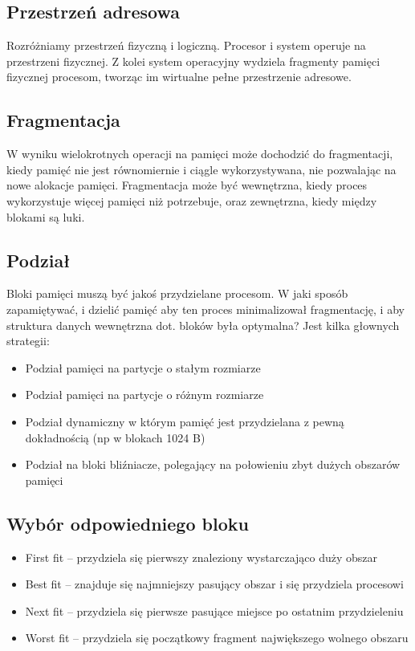 \documentclass{../notatki}
\begin{document}
\subsection{Przestrzeń adresowa}

Rozróżniamy przestrzeń fizyczną i logiczną. Procesor i system operuje
na przestrzeni fizycznej. Z kolei system operacyjny wydziela
fragmenty pamięci fizycznej procesom, tworząc im wirtualne pełne
przestrzenie adresowe.

\subsection{Fragmentacja}

W wyniku wielokrotnych operacji na pamięci może dochodzić do
fragmentacji, kiedy pamięć nie jest równomiernie i ciągle
wykorzystywana, nie pozwalając na nowe alokacje pamięci. Fragmentacja
może być wewnętrzna, kiedy proces wykorzystuje więcej pamięci niż
potrzebuje, oraz zewnętrzna, kiedy między blokami są luki.

\subsection{Podział}

Bloki pamięci muszą być jakoś przydzielane procesom. W jaki sposób
zapamiętywać, i dzielić pamięć aby ten proces minimalizował
fragmentację, i aby struktura danych wewnętrzna dot. bloków była
optymalna? Jest kilka głownych strategii:

\begin{itemize}
  \item Podział pamięci na partycje o stałym rozmiarze
  \item Podział pamięci na partycje o różnym rozmiarze
  \item Podział dynamiczny w którym pamięć jest przydzielana z pewną
    dokładnością (np w blokach 1024 B)
  \item Podział na bloki bliźniacze, polegający na połowieniu zbyt
    dużych obszarów pamięci
\end{itemize}

\subsection{Wybór odpowiedniego bloku}

\begin{itemize}
  \item First fit – przydziela się pierwszy znaleziony wystarczająco duży obszar
  \item Best fit – znajduje się najmniejszy pasujący obszar i się
    przydziela procesowi
  \item Next fit – przydziela się pierwsze pasujące miejsce po
    ostatnim przydzieleniu
  \item Worst fit – przydziela się początkowy fragment największego
    wolnego obszaru
\end{itemize}
\end{document}
